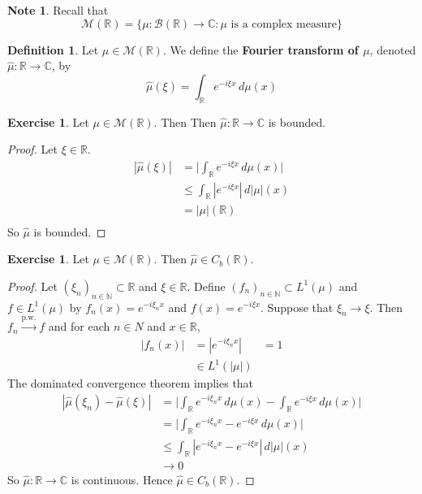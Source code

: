 \documentclass[12pt]{amsart}
\theoremstyle{definition}
\newtheorem{defn}[definition]{Definition}
\newtheorem{note}[definition]{Note}
\newtheorem{ex}[definition]{Exercise}
\newcommand{\C}{\mathbb{C}}
\newcommand{\N}{\mathbb{N}}
\newcommand{\R}{\mathbb{R}}
\newcommand{\MB}{\mathcal{B}}
\newcommand{\MM}{\mathcal{M}}
\newcommand{\dmu}{\, d \mu}
\newcommand{\convt}[1]{\xrightarrow{\text{#1}}}
\begin{document}
	\begin{note}
		Recall that $$\MM(\R) = \{\mu: \MB(\R) \rightarrow \C: \mu \text{ is a complex measure}\}$$
	\end{note}
	
	\begin{defn}
		Let $\mu \in \MM(\R)$. We define the \textbf{Fourier transform of $\mu$}, denoted $\hat{\mu}: \R \rightarrow \C$, by
		$$\hat{\mu}(\xi) = \int_{\R} e^{-i \xi x} \dmu(x)$$ 
	\end{defn}
	
	\begin{ex}
		Let $\mu \in \MM(\R)$. Then Then $\hat{\mu} : \R \rightarrow \C$ is bounded.
	\end{ex}
	
	\begin{proof}
		Let $\xi \in \R$. 
		\begin{align*}
			|\hat{\mu}(\xi)|
			& = \bigg | \int_{\R} e^{-i \xi x} \dmu(x) \bigg| \\
			& \leq \int_{\R} |e^{-i \xi x}| \, d|\mu|(x) \\
			& = |\mu|(\R) \\
		\end{align*}
		So $\hat{\mu}$ is bounded.
	\end{proof}
	
	\begin{ex}
		Let $\mu \in \MM(\R)$. Then $\hat{\mu} \in C_b(\R)$.
	\end{ex}
	
	\begin{proof}
		Let $(\xi_{n})_{n \in \N} \subset \R$ and $\xi \in \R$. Define $(f_n)_{n \in \N} \subset L^1 (\mu)$ and $f \in L^1(\mu)$ by $f_n(x) = e^{-i \xi_n x}$ and $f(x) = e^{-i \xi x}$. Suppose that $\xi_n \rightarrow \xi$. Then $f_n \convt{p.w.} f$ and for each $n \in N$ and $x \in \R$, 
		\begin{align*}
			|f_n(x)|
			&= |e^{-i \xi_n x}| 
			& = 1 \\
			& \in L^1(|\mu|)
		\end{align*}
		The dominated convergence theorem implies that
		\begin{align*}
			|\hat{\mu}(\xi_n) - \hat{\mu}(\xi)| 
			& = \bigg| \int_{\R} e^{-i \xi_n x} \dmu(x) - \int_{\R} e^{-i \xi x} \dmu(x)\bigg| \\
			& =  \bigg| \int_{\R} e^{-i \xi_n x} - e^{-i \xi x} \dmu(x) \bigg| \\
			& \leq \int_{\R} |e^{-i \xi_n x} - e^{-i \xi x}| \, d|\mu|(x) \\
			& \rightarrow 0
		\end{align*}
		So $\hat{\mu}: \R \rightarrow \C$ is continuous. Hence $\hat{\mu} \in C_b(\R)$.
	\end{proof}
	
\end{document}
